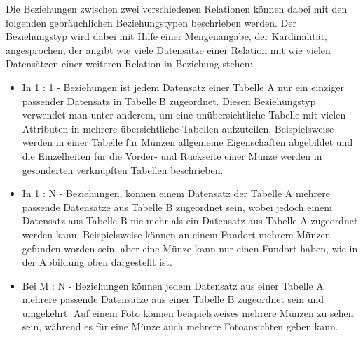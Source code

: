 Die Beziehungen zwischen zwei verschiedenen Relationen können dabei mit den folgenden gebräuchlichen Beziehungstypen beschrieben werden. Der Beziehungstyp wird dabei mit Hilfe einer Mengenangabe, der Kardinalität, angesprochen, der angibt wie viele Datensätze einer Relation mit wie vielen Datensätzen einer weiteren Relation in Beziehung stehen:
\begin{itemize}
	\item In 1 : 1 - Beziehungen ist jedem Datensatz einer Tabelle A nur ein einziger passender Datensatz in Tabelle B zugeordnet. Diesen Beziehungstyp verwendet man unter anderem, um eine unübersichtliche Tabelle mit vielen Attributen in mehrere übersichtliche Tabellen aufzuteilen. Beispielsweise werden in einer Tabelle für Münzen allgemeine Eigenschaften abgebildet und die Einzelheiten für die Vorder- und Rückseite einer Münze werden in gesonderten verknüpften Tabellen beschrieben.
	\item In 1 : N - Beziehungen, können einem Datensatz der Tabelle A mehrere passende Datensätze aus Tabelle B zugeordnet sein, wobei jedoch einem Datensatz aus Tabelle B nie mehr als ein Datensatz aus Tabelle A zugeordnet werden kann. Beispielsweise können an einem Fundort mehrere Münzen gefunden worden sein, aber eine Münze kann nur einen Fundort haben, wie in der Abbildung oben dargestellt ist.
	\item Bei M : N - Beziehungen können jedem Datensatz aus einer Tabelle A mehrere passende Datensätze aus einer Tabelle B zugeordnet sein und umgekehrt. Auf einem Foto können beispielsweises mehrere Münzen zu sehen sein, während es für eine Münze auch mehrere Fotoansichten geben kann.
\end{itemize}

